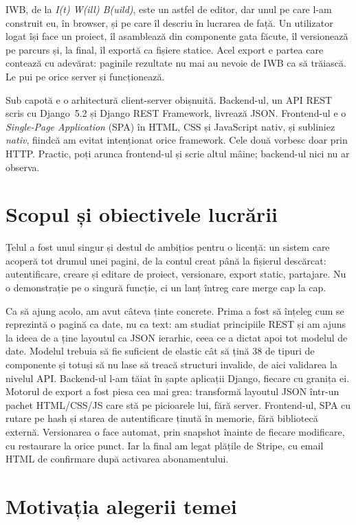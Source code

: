 \documentclass[12pt,a4paper]{report}
\begin{document}
IWB, de la \textit{I(t) W(ill) B(uild)}, este un astfel de
editor, dar unul pe care l-am construit eu, în browser, și pe care îl descriu în
lucrarea de față. Un utilizator logat își face un proiect, îl asamblează din
componente gata făcute, îl versionează pe parcurs și, la final, îl exportă ca
fișiere statice. Acel export e partea care contează cu adevărat: paginile rezultate
nu mai au nevoie de IWB ca să trăiască. Le pui pe orice server și funcționează.

Sub capotă e o arhitectură client-server obișnuită. Backend-ul, un API REST scris cu
Django~5.2 și Django REST Framework, livrează JSON. Frontend-ul e o
\textit{Single-Page Application} (SPA) în HTML, CSS și JavaScript nativ, și subliniez
\emph{nativ}, fiindcă am evitat intenționat orice framework. Cele două vorbesc doar
prin HTTP. Practic, poți arunca frontend-ul și scrie altul mâine; backend-ul nici nu
ar observa.

\section{Scopul și obiectivele lucrării}

Țelul a fost unul singur și destul de ambițios pentru o licență: un sistem care
acoperă tot drumul unei pagini, de la contul creat până la fișierul descărcat:
autentificare, creare și editare de proiect, versionare, export static, partajare.
Nu o demonstrație pe o singură funcție, ci un lanț întreg care merge cap
la cap.

Ca să ajung acolo, am avut câteva ținte concrete. Prima a fost să înțeleg cum se
reprezintă o pagină ca date, nu ca text: am studiat principiile REST și am ajuns la
ideea de a ține layoutul ca JSON ierarhic, ceea ce a dictat apoi tot modelul de date.
Modelul trebuia să fie suficient de elastic cât să țină 38 de tipuri de componente
și totuși să nu lase să treacă structuri invalide, de aici validarea la nivelul
API. Backend-ul l-am tăiat în șapte aplicații Django, fiecare cu granița ei.
Motorul de export a fost piesa cea mai grea: transformă layoutul JSON într-un pachet
HTML/CSS/JS care stă pe picioarele lui, fără server. Frontend-ul, SPA cu rutare pe
hash și starea de autentificare ținută în memorie, fără bibliotecă externă.
Versionarea o face automat, prin snapshot înainte de fiecare modificare, cu
restaurare la orice punct. Iar la final am legat plățile de Stripe, cu email HTML de
confirmare după activarea abonamentului.

\section{Motivația alegerii temei}
\end{document}
